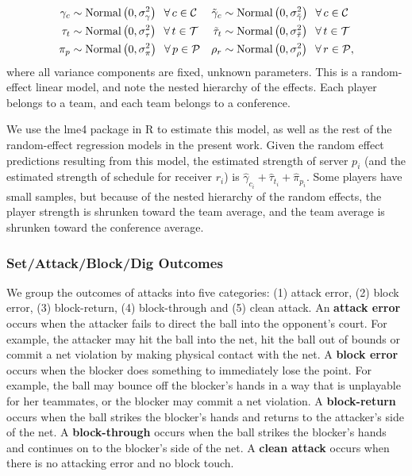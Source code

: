 \documentclass{article}
\begin{document}
\begin{align*}
  \gamma_c &\sim \mbox{Normal}\left(0, \sigma^2_\gamma\right) \hspace{2mm} \forall\, c \in \mathcal{C} &
  \tilde\gamma_c &\sim \mbox{Normal}\left(0, \sigma^2_{\tilde\gamma}\right) \hspace{2mm} \forall\, c \in \mathcal{C} \\
  \tau_t &\sim \mbox{Normal}\left(0, \sigma^2_\tau\right) \hspace{2mm} \forall\, t \in \mathcal{T} &
  \tilde\tau_t &\sim \mbox{Normal}\left(0, \sigma^2_{\tilde\tau}\right) \hspace{2mm} \forall\, t \in \mathcal{T} \\
  \pi_p &\sim \mbox{Normal}\left(0, \sigma^2_\pi\right) \hspace{2mm} \forall\, p \in \mathcal{P} &
  \rho_r &\sim \mbox{Normal}\left(0, \sigma^2_\rho\right) \hspace{2mm} \forall\, r \in \mathcal{P},
\end{align*}
where all variance components are fixed, unknown parameters. This is a random-effect linear model, and note the nested hierarchy of the effects. Each player belongs to a team, and each team belongs to a conference.

We use the lme4 package \citep{bates_etal_2015} in R to estimate this model, as well as the rest of the random-effect regression models in the present work. Given the random effect predictions resulting from this model, the estimated strength of server $p_i$ (and the estimated strength of schedule for receiver $r_i$) is $\hat\gamma_{c_i} + \hat\tau_{t_i} + \hat\pi_{p_i}$. Some players have small samples, but because of the nested hierarchy of the random effects, the player strength is shrunken toward the team average, and the team average is shrunken toward the conference average.

\subsubsection{Set/Attack/Block/Dig Outcomes}
\label{sec:sos-attack}

We group the outcomes of attacks into five categories: (1) attack error, (2) block error, (3) block-return, (4) block-through and (5) clean attack. An {\bf attack error} occurs when the attacker fails to direct the ball into the opponent's court. For example, the attacker may hit the ball into the net, hit the ball out of bounds or commit a net violation by making physical contact with the net. A {\bf block error} occurs when the blocker does something to immediately lose the point. For example, the ball may bounce off the blocker's hands in a way that is unplayable for her teammates, or the blocker may commit a net violation. A {\bf block-return} occurs when the ball strikes the blocker's hands and returns to the attacker's side of the net. A {\bf block-through} occurs when the ball strikes the blocker's hands and continues on to the blocker's side of the net. A {\bf clean attack} occurs when there is no attacking error and no block touch.
\end{document}
